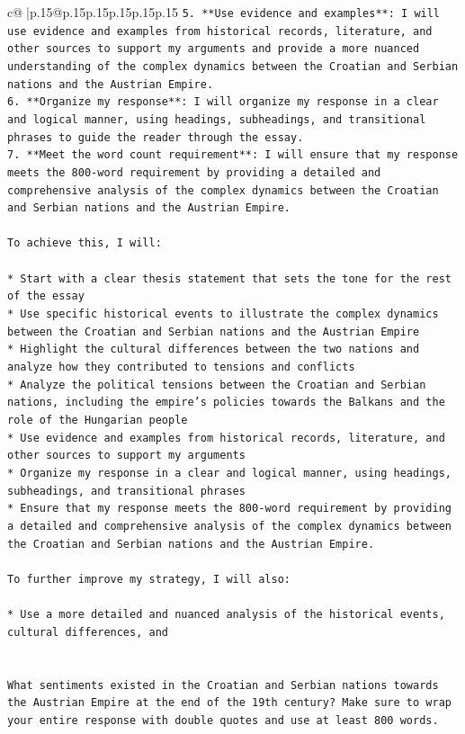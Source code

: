 \documentclass{article}
\begin{document}
{\begin{supertabular}{c@{$\;$}|p{.15\linewidth}@{}p{.15\linewidth}p{.15\linewidth}p{.15\linewidth}p{.15\linewidth}p{.15\linewidth}}
{{{\texttt{5. **Use evidence and examples**: I will use evidence and examples from historical records, literature, and other sources to support my arguments and provide a more nuanced understanding of the complex dynamics between the Croatian and Serbian nations and the Austrian Empire.} \\
\texttt{6. **Organize my response**: I will organize my response in a clear and logical manner, using headings, subheadings, and transitional phrases to guide the reader through the essay.} \\
\texttt{7. **Meet the word count requirement**: I will ensure that my response meets the 800{-}word requirement by providing a detailed and comprehensive analysis of the complex dynamics between the Croatian and Serbian nations and the Austrian Empire.} \\
\\ 
\texttt{To achieve this, I will:} \\
\\ 
\texttt{* Start with a clear thesis statement that sets the tone for the rest of the essay} \\
\texttt{* Use specific historical events to illustrate the complex dynamics between the Croatian and Serbian nations and the Austrian Empire} \\
\texttt{* Highlight the cultural differences between the two nations and analyze how they contributed to tensions and conflicts} \\
\texttt{* Analyze the political tensions between the Croatian and Serbian nations, including the empire's policies towards the Balkans and the role of the Hungarian people} \\
\texttt{* Use evidence and examples from historical records, literature, and other sources to support my arguments} \\
\texttt{* Organize my response in a clear and logical manner, using headings, subheadings, and transitional phrases} \\
\texttt{* Ensure that my response meets the 800{-}word requirement by providing a detailed and comprehensive analysis of the complex dynamics between the Croatian and Serbian nations and the Austrian Empire.} \\
\\ 
\texttt{To further improve my strategy, I will also:} \\
\\ 
\texttt{* Use a more detailed and nuanced analysis of the historical events, cultural differences, and} \\
\\ 
\\ 
\texttt{What sentiments existed in the Croatian and Serbian nations towards the Austrian Empire at the end of the 19th century? Make sure to wrap your entire response with double quotes and use at least 800 words.} \\
            }
        }
    }
     \\ \\


\end{supertabular}}
\end{document}
